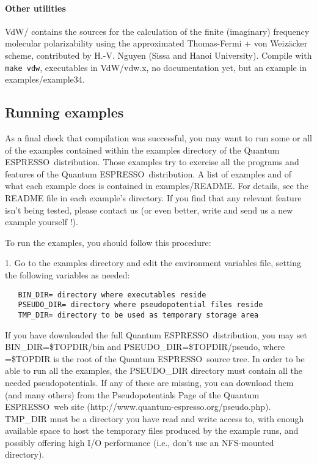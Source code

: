 \documentclass[12pt,a4paper]{article}
\def\qe{{\sc Quantum ESPRESSO}}
\begin{document}
\paragraph{Other utilities}
VdW/ contains the sources for the calculation of the finite (imaginary)
frequency molecular polarizability using the approximated Thomas-Fermi
+ von Weiz\"acker scheme, contributed by H.-V. Nguyen (Sissa and
Hanoi University). Compile with \texttt{make vdw}, executables in VdW/vdw.x, no
documentation yet, but an example in examples/example34.  

\subsection{Running examples}

As a final check that compilation was successful, you may want to run some or
all of the examples contained within the examples directory of the 
\qe\ distribution. Those examples try to exercise all the programs
and features of the \qe\ distribution. A list of examples and
of what each example does is contained in examples/README. For details,
see the README file in each example's directory. If you find that any relevant
feature isn't being tested, please contact us (or even better, write and send
us a new example yourself !).
     
To run the examples, you should follow this procedure:

    
1. Go to the examples directory and edit the environment variables
   file, setting the following variables as needed: 
\begin{verbatim}
   BIN_DIR= directory where executables reside
   PSEUDO_DIR= directory where pseudopotential files reside
   TMP_DIR= directory to be used as temporary storage area
\end{verbatim}
If you have downloaded the full \qe\ distribution, you may set 
BIN\_DIR=\$TOPDIR/bin and PSEUDO\_DIR=\$TOPDIR/pseudo, where =\$TOPDIR
is the root of the \qe\ source tree. In order to be able
to run all the examples, the PSEUDO\_DIR directory must contain all the
needed pseudopotentials. 
If any of these are missing, you can download them (and many others)
from the Pseudopotentials Page of the \qe\ web site
(http://www.quantum-espresso.org/pseudo.php). TMP\_DIR must be a
directory you 
have read and write access to, with enough available space to host the
temporary files produced by the example runs, and possibly offering
high I/O performance (i.e., don't use an NFS-mounted directory). 
\end{document}
